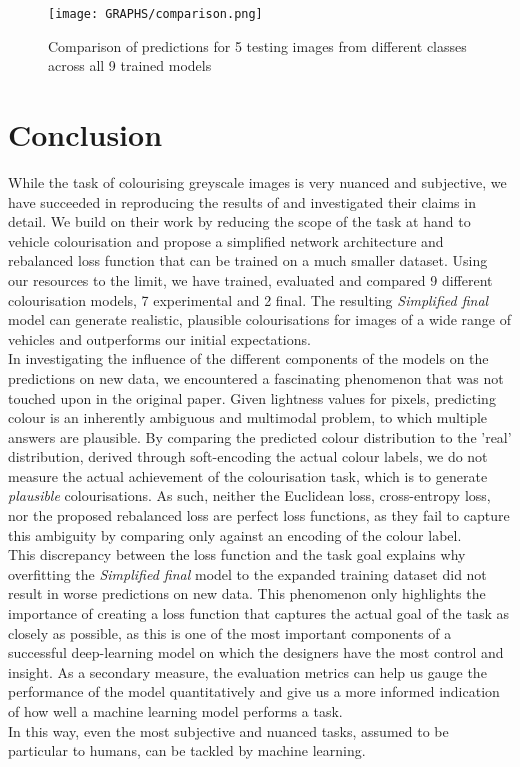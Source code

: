 \documentclass{article}
\begin{document}
\begin{figure}
    \centering
    \texttt{[image: GRAPHS/comparison.png]}
    \caption{Comparison of predictions for 5 testing images from different classes across all 9 trained models}
    \label{fig:comparison}
\end{figure}
\restoregeometry

\section{Conclusion}
While the task of colourising greyscale images is very nuanced and subjective,
we have succeeded in reproducing the results of \cite{colourful} and investigated their claims in detail.
We build on their work by reducing the scope of the task at hand to vehicle colourisation and
propose a simplified network architecture and rebalanced loss function that can be trained on a much smaller dataset.
Using our resources to the limit, we have trained, evaluated and compared 9 different colourisation models,
7 experimental and 2 final.
The resulting \textit{Simplified final} model can generate realistic, plausible colourisations for images of a wide range
of vehicles and outperforms our initial expectations.\\
In investigating the influence of the different components of the models on the predictions on new data,
we encountered a fascinating phenomenon that was not touched upon in the original paper.
Given lightness values for pixels, predicting colour is an inherently ambiguous and multimodal problem, to which multiple
answers are plausible. By comparing the predicted colour distribution to the 'real' distribution, derived through soft-encoding the actual colour labels,
we do not measure the actual achievement of the colourisation task, which is to generate \textit{plausible} colourisations.
As such, neither the Euclidean loss, cross-entropy loss, nor the proposed rebalanced loss are perfect loss functions, as they fail
to capture this ambiguity by comparing only against an encoding of the colour label.\\
This discrepancy between the loss function and the task goal explains why overfitting the \textit{Simplified final} model
to the expanded training dataset did not result in worse predictions on new data.
This phenomenon only highlights the importance of creating a loss function that captures the actual goal of the task
as closely as possible, as this is one of the most important components of a successful deep-learning model on which
the designers have the most control and insight.
As a secondary measure, the evaluation metrics can help us gauge the performance of the model quantitatively and
give us a more informed indication of how well a machine learning model performs a task.\\
In this way, even the most subjective and nuanced tasks, assumed to be particular to humans, can be tackled by machine learning.



\end{document}

